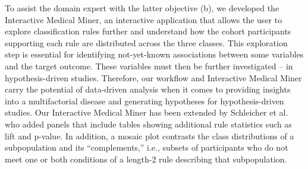 \documentclass[
  oneside]{book}
\begin{document}
To assist the domain expert with the latter objective (b), we developed the Interactive Medical Miner, an interactive application that allows the user to explore classification rules further and understand how the cohort participants supporting each rule are distributed across the three classes.
This exploration step is essential for identifying not-yet-known associations between some variables and the target outcome.
These variables must then be further investigated -- in hypothesis-driven studies.
Therefore, our workflow and Interactive Medical Miner carry the potential of data-driven analysis when it comes to providing insights into a multifactorial disease and generating hypotheses for hypothesis-driven studies.
Our Interactive Medical Miner has been extended by Schleicher et al.~\autocite{Schleicher:CBMS17} who added panels that include tables showing additional rule statistics such as lift and p-value.
In addition, a mosaic plot contrasts the class distributions of a subpopulation and its ``complements,'' i.e., subsets of participants who do not meet one or both conditions of a length-2 rule describing that subpopulation.
\end{document}
